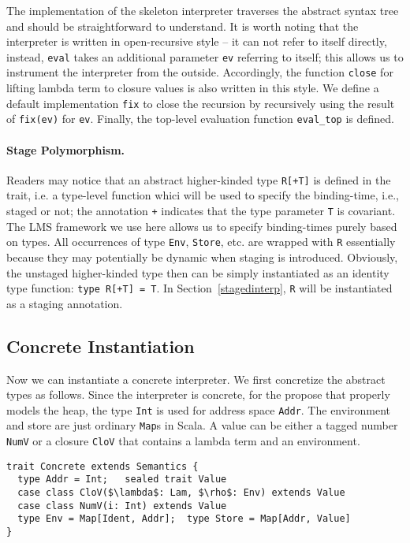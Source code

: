 The implementation of the skeleton interpreter traverses the abstract syntax tree and should be straightforward to understand.
It is worth noting that the interpreter is written in open-recursive style -- 
it can not refer to itself directly, instead, \texttt{eval} takes an additional 
parameter \texttt{ev} referring to itself; this allows us to instrument the interpreter
from the outside. Accordingly, the function \texttt{close} for lifting lambda term to closure values
is also written in this style.
We define a default implementation \texttt{fix} to close the recursion by recursively using the result 
of \texttt{fix(ev)} for \texttt{ev}. 
Finally, the top-level evaluation function \texttt{eval\_top} is defined.

\paragraph{Stage Polymorphism.}
Readers may notice that an abstract higher-kinded type \texttt{R[+T]} is defined in the trait, i.e. a
type-level function whici will be used to specify the binding-time, i.e., staged or not; the annotation 
\texttt{+} indicates that the type parameter \texttt{T} is covariant.
The LMS framework we use here allows us to specify binding-times purely based on types.
All occurrences of type \texttt{Env}, \texttt{Store}, etc. are wrapped with \texttt{R} 
essentially because they may potentially be dynamic when staging is introduced.
Obviously, the unstaged higher-kinded type then can be simply instantiated as an identity type function: 
\texttt{type R[+T] = T}. In Section~\ref{stagedinterp}, \texttt{R} will be instantiated 
as a staging annotation. 

\subsection{Concrete Instantiation} \label{unstaged_conc}
Now we can instantiate a concrete interpreter. We first concretize the abstract types as follows.
Since the interpreter is concrete, for the propose that properly models the heap, the type \texttt{Int} 
is used for address space \texttt{Addr}. The environment and store are just ordinary \texttt{Map}s in Scala.
A value can be either a tagged number \texttt{NumV} or a closure \texttt{CloV} that contains a lambda term
and an environment.

\begin{lstlisting}
trait Concrete extends Semantics {
  type Addr = Int;   sealed trait Value
  case class CloV($\lambda$: Lam, $\rho$: Env) extends Value
  case class NumV(i: Int) extends Value
  type Env = Map[Ident, Addr];  type Store = Map[Addr, Value]
}
\end{lstlisting}


